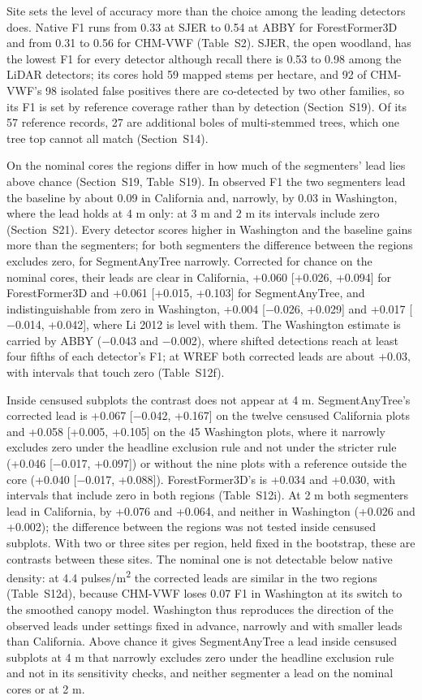 \documentclass[journal]{IEEEtran}
\begin{document}
Site sets the level of accuracy more than the choice among the leading detectors
does. Native F1 runs from 0.33 at SJER to 0.54 at ABBY for ForestFormer3D and
from 0.31 to 0.56 for CHM-VWF (Table~S2). SJER, the open woodland, has the
lowest F1 for every detector although recall there is 0.53 to 0.98 among the
LiDAR detectors; its cores hold 59 mapped stems per hectare, and 92 of CHM-VWF's
98 isolated false positives there are co-detected by two other families, so its
F1 is set by reference coverage rather than by detection (Section~S19). Of its
57 reference records, 27 are additional boles of multi-stemmed trees, which one
tree top cannot all match (Section~S14).

On the nominal cores the regions differ in how much of the segmenters' lead lies
above chance (Section~S19, Table~S19). In observed F1 the two segmenters lead
the baseline by about 0.09 in California and, narrowly, by 0.03 in Washington,
where the lead holds at 4 m only: at 3 m and 2 m its intervals include zero
(Section~S21). Every detector scores higher in Washington and the baseline gains
more than the segmenters; for both segmenters the difference between the regions
excludes zero, for SegmentAnyTree narrowly. Corrected for chance on the nominal
cores, their leads are clear in California, +0.060 [+0.026, +0.094] for
ForestFormer3D and +0.061 [+0.015, +0.103] for SegmentAnyTree, and
indistinguishable from zero in Washington, +0.004 [$-$0.026, +0.029] and +0.017
[$-$0.014, +0.042], where Li 2012 is level with them. The Washington estimate is
carried by ABBY ($-$0.043 and $-$0.002), where shifted detections reach at least
four fifths of each detector's F1; at WREF both corrected leads are about +0.03,
with intervals that touch zero (Table~S12f).

Inside censused subplots the contrast does not appear at 4 m. SegmentAnyTree's
corrected lead is +0.067 [$-$0.042, +0.167] on the twelve censused California
plots and +0.058 [+0.005, +0.105] on the 45 Washington plots, where it narrowly
excludes zero under the headline exclusion rule and not under the stricter rule
(+0.046 [$-$0.017, +0.097]) or without the nine plots with a reference outside the
core (+0.040 [$-$0.017, +0.088]). ForestFormer3D's is +0.034 and +0.030, with
intervals that include zero in both regions (Table~S12i). At 2 m both segmenters
lead in California, by +0.076 and +0.064, and neither in Washington (+0.026 and
+0.002); the difference between the regions was not tested inside censused
subplots. With two or three sites per region, held fixed in the bootstrap, these
are contrasts between these sites. The nominal one is not detectable below
native density: at 4.4 pulses/m\textsuperscript{2} the corrected leads are similar in the two
regions (Table~S12d), because CHM-VWF loses 0.07 F1 in Washington at its switch
to the smoothed canopy model. Washington thus reproduces the direction of the
observed leads under settings fixed in advance, narrowly and with smaller leads
than California. Above chance it gives SegmentAnyTree a lead inside censused
subplots at 4 m that narrowly excludes zero under the headline exclusion rule
and not in its sensitivity checks, and neither segmenter a lead on the nominal
cores or at 2 m.
\end{document}
